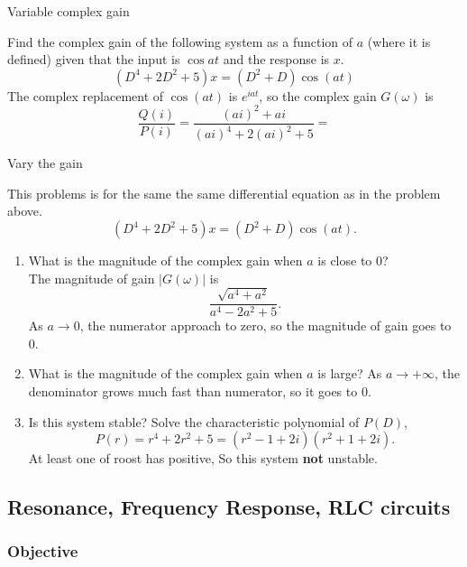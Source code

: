 \begin{problem}
  Variable complex gain
\end{problem}

Find the complex gain of the following system as a function of $a$ (where it is defined)
given that the input is $\cos⁡ at$ and the response is $x$.
\begin{equation*}
  (D^4+2D^2+5)x = (D^2+D)\cos (at)
\end{equation*}
The complex replacement of $\cos (at)$ is $e^{iat}$, so the complex gain $G(\omega)$ is
\begin{equation*}
  \frac{Q(i)}{P(i)} = \frac{(ai)^2 + ai}{(ai)^4 + 2(ai)^2 + 5} = 
\end{equation*}

\begin{problem}
  Vary the gain
\end{problem}
This problems is for the same the same differential equation
as in the problem above.
\begin{equation*}
  (D^4+2D^2+5)x = (D^2+D)\cos (at).
\end{equation*}

\begin{enumerate}
\item What is the magnitude of the complex gain when $a$ is close to $0$? \\
  The magnitude of gain $\left| G(\omega) \right|$ is
  \begin{equation*}
    \frac{\sqrt{a^4 + a^2}}{a^4 -2a^2 + 5}. 
  \end{equation*}
  As $a \to 0$, the numerator approach to zero, so the magnitude of gain goes to $0$.
\item What is the magnitude of the complex gain when $a$ is large?
  As $a \to + \infty$, the denominator grows much fast than numerator,
  so it goes to $0$.
\item Is this system stable?
  Solve the characteristic polynomial of $P(D)$,
  \begin{equation*}
    P(r) = r^4 + 2r^2 + 5 = (r^2 -1 + 2i)(r^2 + 1 + 2i). 
  \end{equation*}
  At least one of roost has positive, So this system \textbf{not} unstable. 
\end{enumerate}
\clearpage

\subsection{Resonance, Frequency Response, RLC circuits}
\subsubsection{Objective}

